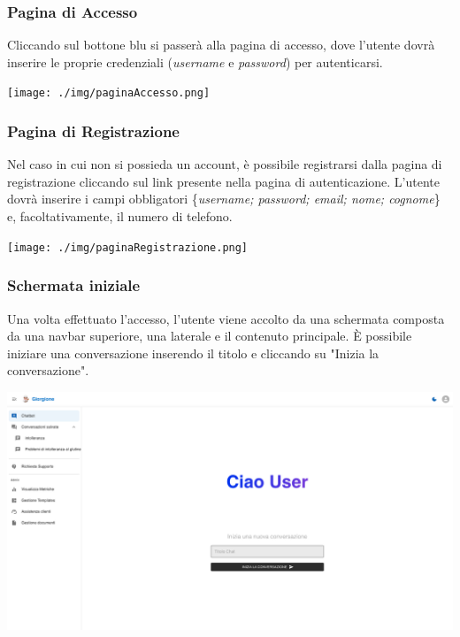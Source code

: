 \subsubsection{Pagina di Accesso}
Cliccando sul bottone blu si passerà alla pagina di accesso, dove l'utente dovrà inserire le proprie credenziali (\textit{username} e \textit{password}) per autenticarsi.
\begin{center}
    \texttt{[image: ./img/paginaAccesso.png]}
\end{center}

\subsubsection{Pagina di Registrazione}
Nel caso in cui non si possieda un account, è possibile registrarsi dalla pagina di registrazione cliccando sul link presente nella pagina di autenticazione. L'utente dovrà inserire i campi obbligatori \{\textit{username; password; email; nome; cognome}\} e, facoltativamente, il numero di telefono.
\begin{center}
    \texttt{[image: ./img/paginaRegistrazione.png]}
\end{center}

\subsubsection{Schermata iniziale}
Una volta effettuato l'accesso, l'utente viene accolto da una schermata composta da una navbar superiore, una laterale e il contenuto principale. È possibile iniziare una conversazione inserendo il titolo e cliccando su "Inizia la conversazione".
\begin{center}
    \includegraphics[width=\textwidth]{./img/paginaIniziale.png}
\end{center}

